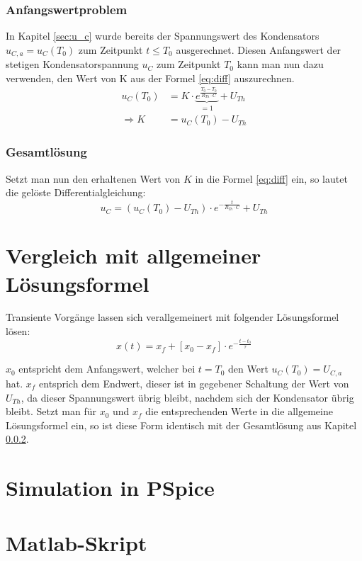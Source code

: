 \documentclass[11pt]{scrartcl}
\begin{document}
\subsubsection{Anfangswertproblem}
In Kapitel \ref{sec:u_c} wurde bereits der Spannungswert des Kondensators $u_{C,a} = u_C(T_0)$ zum Zeitpunkt $t \leq T_0$ ausgerechnet.
Diesen Anfangswert der stetigen Kondensatorspannung $u_C$ zum Zeitpunkt $T_0$ kann man nun dazu verwenden,
den Wert von K aus der Formel \ref{eq:diff} auszurechnen.
\begin{align*}
  u_C (T_0) &= K \cdot \underbrace{e^{\frac{T_0 - T_0}{R_{Th}\cdot C}}}_{=1} + U_{Th} \\
  \Longrightarrow K &= u_C (T_0) - U_{Th}
\end{align*}

\subsubsection{Gesamtlösung}\label{sec:sol}
Setzt man nun den erhaltenen Wert von $K$ in die Formel \ref{eq:diff} ein, so lautet die gelöste Differentialgleichung:
\begin{equation*}
  u_C = (u_C(T_0) - U_{Th}) \cdot e^{-\frac{t}{R_{Th}\cdot C}} + U_{Th}
\end{equation*}

\section{Vergleich mit allgemeiner Lösungsformel}
Transiente Vorgänge lassen sich verallgemeinert mit folgender Lösungsformel lösen:
\begin{equation*}
  x(t) = x_f + \left[ x_0 - x_f \right] \cdot e^{-\frac{t-t_0}{\tau}}
\end{equation*}

$x_0$ entspricht dem Anfangswert, welcher bei $t=T_0$ den Wert $u_C(T_0) = U_{C,a}$ hat.
$x_f$ entsprich dem Endwert, dieser ist in gegebener Schaltung der Wert von $U_{Th}$, da dieser Spannungswert übrig bleibt,
nachdem sich der Kondensator übrig bleibt.
Setzt man für $x_0$ und $x_f$ die entsprechenden Werte in die allgemeine Lösungsformel ein,
so ist diese Form identisch mit der Gesamtlösung aus Kapitel \ref{sec:sol}.
\section{Simulation in PSpice}
\section{Matlab-Skript}
\end{document}
